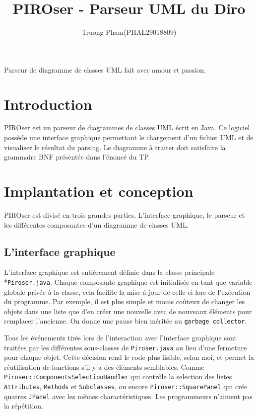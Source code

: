 \documentclass[12pt]{article}
\title{PIROser - Parseur UML du Diro}
\author{Truong Pham(PHAL29018809)}
\begin{document}
\maketitle

\abstract
Parseur de diagramme de classes UML fait avec amour et passion.
\section{Introduction}

PIROser est un parseur de diagrammes de classes UML écrit en Java. Ce logiciel possède une interface graphique permettant le chargement d'un fichier UML et de visualiser le résultat du parsing. Le diagramme à traiter doit satisfaire la grammaire BNF présentée dans l'énoncé du TP.

\section{Implantation et conception}

PIROser est divisé en trois grandes parties. L'interface graphique, le parseur et les différentes composantes d'un diagramme de classes UML.

\subsection{L'interface graphique}

L'interface graphique est entièrement définie dans la classe principale \\*\texttt{Piroser.java}. Chaque composante graphique est initialisée en tant que variable globale privée à la classe, cela facilite la mise à jour de celle-ci lors de l'exécution du programme. Par exemple, il est plus simple et moins coûteux de changer les objets dans une liste que d'en créer une nouvelle avec de nouveaux éléments pour remplacer l'ancienne. On donne une pause bien méritée au \texttt{garbage collector}. 

Tous les événements tirés lors de l'interaction avec l'interface graphique sont traitées par les différentes sous-classes de  \texttt{Piroser.java} au lieu d'une fermeture pour chaque objet. Cette décision rend le code plus lisible, selon moi, et permet la réutilisation de fonctions s'il y a des éléments semblables. Comme \texttt{Piroser::ComponentsSelectionHandler} qui contrôle la selection des listes \texttt{Attributes}, \texttt{Methods} et \texttt{Subclasses}, ou encore \texttt{Piroser::SquarePanel} qui crée quatres \texttt{JPanel} avec les mêmes charactéristiques. Les programmeurs n'aiment pas la répétition.
\end{document}
